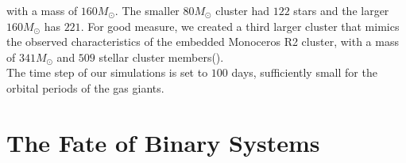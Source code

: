 \documentclass{aastex631}
\begin{document}
with a mass of $160 M_{\odot}$. The smaller $80M_{\odot}$ cluster had $122$ stars and the larger $160 M_{\odot}$ has $221$. For good measure, we created a third larger cluster
that mimics the observed characteristics of the embedded Monoceros R2 cluster, with a mass of $341 M_{\odot}$ and $509$ stellar cluster members(\cite{car97}). \\
The time step of our simulations is set to $100$ days, sufficiently small for the orbital periods of the gas giants. 
\section{The Fate of Binary Systems}
\end{document}
